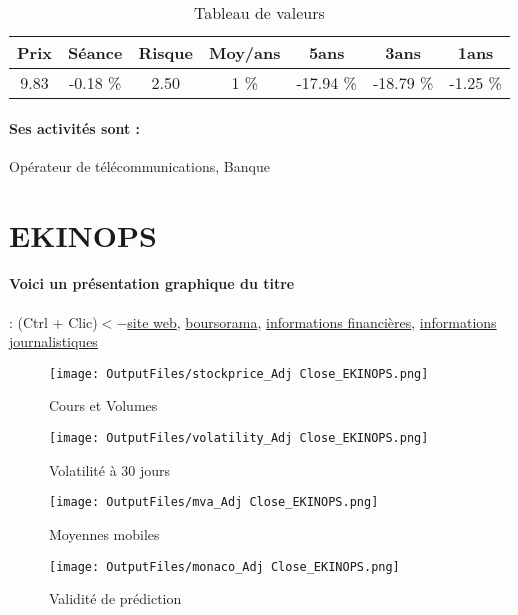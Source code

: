\documentclass[11pt,a4paper]{report}%
\begin{document}
\begin{table}[H]
  \centering
    \begin{tabular}{|c|c|c|c|c|c|c|}
    \hline
    Prix & Séance & Risque  & Moy/ans & 5ans & 3ans & 1ans \\
    \hline
    9.83 &    -0.18 \%    & 2.50 & 1 \% & -17.94 \% & -18.79 \% & -1.25 \% \\
    \hline
    \end{tabular}%
        \label{tab:table_ORANGE}%
      \caption{Tableau de valeurs}
\end{table}%

\paragraph{Ses activités sont : } Opérateur de télécommunications, Banque 
    
    \newpage

\section{EKINOPS}

\paragraph{Voici un présentation graphique du titre} : (Ctrl + Clic)$<-$\href{https://www.ekinops.com/fr/}{site web}, \href{https://www.boursorama.com/cours/1rPEKI}{boursorama}, \href{https://www.qwant.com/?q=site:https:%2f%2fwww.easybourse.com%2faction-societe%2fEKINOPS&t=web&client=ext-firefox-hp}{informations financières}, \href{https://bourse.lerevenu.com/cours-de-bourse/fiche-valeur-synthese/EKINOPS/EKI-FR}{informations journalistiques}
\begin{figure}[!htb]
   \begin{minipage}{0.5\textwidth}
     \centering
     \texttt{[image: OutputFiles/stockprice\_Adj Close\_EKINOPS.png]}
     \caption{Cours et Volumes}\label{Fig:price_EKINOPS}
   \end{minipage}\hfill
   \begin{minipage}{0.5\textwidth}
     \centering
     \texttt{[image: OutputFiles/volatility\_Adj Close\_EKINOPS.png]}
     \caption{Volatilité à 30 jours}\label{Fig:volat_EKINOPS}
   \end{minipage}
\end{figure}
\begin{figure}[!htb]
   \begin{minipage}{0.5\textwidth}
     \centering
     \texttt{[image: OutputFiles/mva\_Adj Close\_EKINOPS.png]}
     \caption{Moyennes mobiles}\label{Fig:mva_EKINOPS}
   \end{minipage}\hfill
   \begin{minipage}{0.5\textwidth}
     \centering
     \texttt{[image: OutputFiles/monaco\_Adj Close\_EKINOPS.png]}
     \caption{Validité de prédiction}\label{Fig:prediction_EKINOPS}
   \end{minipage}
\end{figure}
\end{document}
